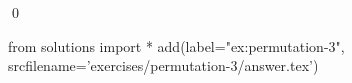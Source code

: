 
\begin{ex} 
  \label{ex:permutation-3}
  
  \qed
\end{ex} 
\begin{python0}
from solutions import *
add(label="ex:permutation-3",
    srcfilename='exercises/permutation-3/answer.tex') 
\end{python0}
